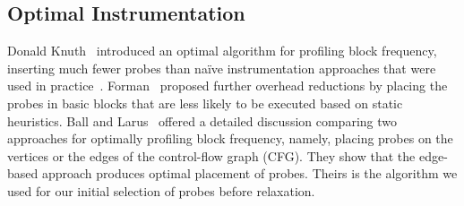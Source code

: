 \subsection{Optimal Instrumentation}

Donald Knuth~\cite{knuth73} introduced an optimal algorithm for profiling block frequency, inserting much fewer probes than na\"ive
instrumentation approaches that were used in practice~\cite{knuth71}. Forman~\cite{forman81} proposed further overhead reductions by
placing the probes in basic blocks that are less likely to be executed based on static heuristics. Ball and Larus~\cite{ball94} offered a
detailed discussion comparing two approaches for optimally profiling block frequency, namely, placing probes on the vertices or the edges
of the control-flow graph (CFG). They show that the edge-based approach produces optimal placement of probes. Theirs is the algorithm we
used for our initial selection of probes before relaxation.
